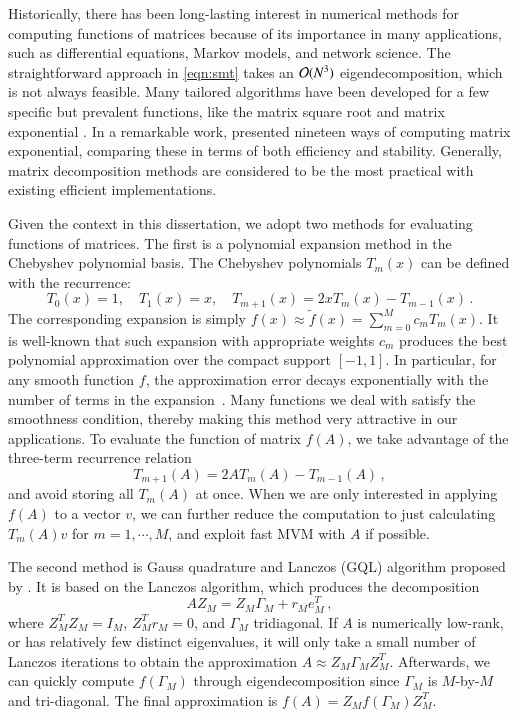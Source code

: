 Historically, there has been long\hyp{}lasting interest in numerical methods for
computing functions of matrices because of its importance in many applications,
such as differential equations, Markov models, and network science. The
straightforward approach in \cref{eqn:smt} takes an $\mathcal{O}(N^3)$
eigendecomposition, which is not always feasible. Many tailored algorithms have
been developed for a few specific but prevalent functions, like the matrix
square root and matrix exponential \cite[Chapter 6 \& 10]{higham2008functions}.
In a remarkable work, \citet{moler2003nineteen} presented nineteen ways of
computing matrix exponential, comparing these in terms of both efficiency and
stability. Generally, matrix decomposition methods are considered to be the most
practical with existing efficient implementations.

Given the context in this dissertation, we adopt two methods for evaluating
functions of matrices. The first is a polynomial expansion method in the
Chebyshev polynomial basis. The Chebyshev polynomials $T_m(x)$ can be defined
with the recurrence:
\begin{equation}\label{eqn:cheb_3term}
	T_0(x) = 1,\quad T_1(x) = x,\quad T_{m+1}(x) = 2xT_m(x) - T_{m-1}(x)\,.
\end{equation}
The corresponding expansion is simply $f(x) \approx \tilde{f}(x)= \sum_
{m=0}^Mc_mT_m(x)$. It is well\hyp{}known that such expansion with appropriate
weights $c_m$ produces the best polynomial approximation over the compact
support $[-1,1]$. In particular, for any smooth function $f$, the approximation
error decays exponentially with the number of terms in the expansion~\cite{
Trefethen-2013-ATAP}. Many functions we deal with satisfy the smoothness
condition, thereby making this method very attractive in our applications. To
evaluate the function of matrix $f(A)$, we take advantage of the three\hyp{}term
recurrence relation
\begin{equation}\label{eqn:3term_fom}
	T_{m+1}(A) = 2AT_m(A)-T_{m-1}(A)\,,
\end{equation}
and avoid storing all $T_m(A)$ at once. When we are only interested in applying
$f(A)$ to a vector $v$, we can further reduce the computation to just
calculating $T_m(A)v$ for $m = 1,\cdots, M$, and exploit fast MVM with $A$ if
possible.

The second method is Gauss quadrature and Lanczos (GQL) algorithm proposed by 
\citet{golub1997matrices}. It is based on the Lanczos algorithm, which produces
the decomposition
\begin{equation}\label{eqn:lan_decomp}
	AZ_M = Z_M\Gamma_M + r_Me_M^T\,,
\end{equation}
where $Z_M^TZ_M = I_M$, $Z_M^Tr_M = 0$, and $\Gamma_M$ tridiagonal. If $A$ is
numerically low\hyp{}rank, or has relatively few distinct eigenvalues, it will
only take a small number of Lanczos iterations to obtain the approximation
$A\approx Z_M\Gamma_MZ_M^T$. Afterwards, we can quickly compute $f(\Gamma_M)$
through eigendecomposition since $\Gamma_M$ is $M$\hyp{}by\hyp{}$M$ and
tri\hyp{}diagonal. The final approximation is $f(A) = Z_Mf(\Gamma_M)Z_M^T$.

